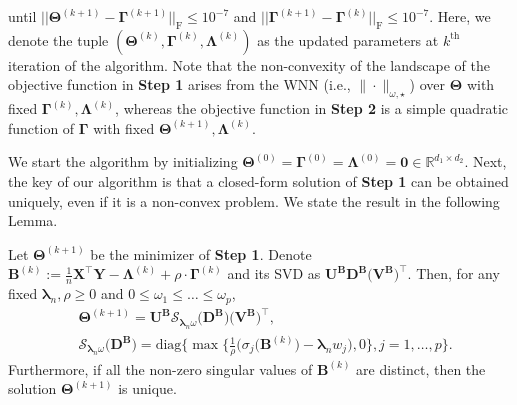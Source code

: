 \documentclass[alpha-refs]{wiley-article}
\begin{document}
until $|| \boldsymbol{\Theta}^{(k+1)}-\boldsymbol{\Gamma}^{(k+1)} ||_{\text{F}}\leq 10^{-7}$ and $|| \boldsymbol{\Gamma}^{(k+1)}-\boldsymbol{\Gamma}^{(k)} ||_{\text{F}}\leq 10^{-7}$.
Here, we denote the tuple $(\boldsymbol{\Theta}^{(k)},\boldsymbol{\Gamma}^{(k)},\boldsymbol{\Lambda}^{(k)})$ as the updated parameters at $k^{\text{th}}$ iteration of the algorithm.
Note that the non-convexity of the landscape of the objective function in \textbf{Step 1} arises from the WNN  (i.e., $\|\cdot\|_{\omega,\star}$) over $\boldsymbol{\Theta}$ with fixed $\boldsymbol{\Gamma}^{(k)},\boldsymbol{\Lambda}^{(k)}$, whereas the objective function in \textbf{Step 2} is a simple quadratic function of $\boldsymbol{\Gamma}$ with fixed $\boldsymbol{\Theta}^{(k+1)},\boldsymbol{\Lambda}^{(k)}$.

We start the algorithm by initializing  $\boldsymbol{\Theta}^{(0)}=\boldsymbol{\Gamma}^{(0)}=\boldsymbol{\Lambda}^{(0)}=\boldsymbol{0} \in\mathbb{R}^{d_{1}\times d_{2}}$.
Next, the key of our algorithm is that a closed-form solution of \textbf{Step 1} can be obtained uniquely, even if it is a non-convex problem.
We state the result in the following Lemma.
\begin{lemma} \label{Lemma2.1}
    Let $\boldsymbol{\Theta}^{(k+1)}$ be the minimizer of \textbf{Step 1}.
    Denote $\boldsymbol{B}^{(k)}:=\frac{1}{n}\boldsymbol{X}^{\top}\boldsymbol{Y}-\boldsymbol{\Lambda}^{(k)}+\rho \cdot \boldsymbol{\Gamma}^{(k)}$ and its SVD as $\boldsymbol{U}^{\textbf{B}}\boldsymbol{D}^{\textbf{B}}\big(\boldsymbol{V}^{\textbf{B}}\big)^{\top}$.
    Then, for any fixed $\boldsymbol{\lambda}_{n}, \rho \geq 0 $ and $0\leq \omega_{1} \leq \dots \leq \omega_{p}$,
    \begin{align*}
        &\boldsymbol{\Theta}^{(k+1)} = \boldsymbol{U}^{\textbf{B}}\mathcal{S}_{\boldsymbol{\lambda}_{n}\omega}\big(\boldsymbol{D}^{\textbf{B}}\big)\big(\boldsymbol{V}^{\textbf{B}}\big)^{\top}, \\
        &\mathcal{S}_{\boldsymbol{\lambda}_{n}\omega}\big(\boldsymbol{D}^{\textbf{B}}\big) = \text{diag}\bigg\{ \max\bigg\{\frac{1}{\rho}\big(\sigma_{j}(\boldsymbol{B}^{(k)}\big)-\boldsymbol{\lambda}_{n} w_{j}\big),0 \bigg\},  j=1,\dots,p \bigg\}.
    \end{align*}
    Furthermore, if all the non-zero singular values of $\boldsymbol{B}^{(k)}$ are distinct, then the solution $\boldsymbol{\Theta}^{(k+1)}$ is unique.
\end{lemma}
\end{document}
